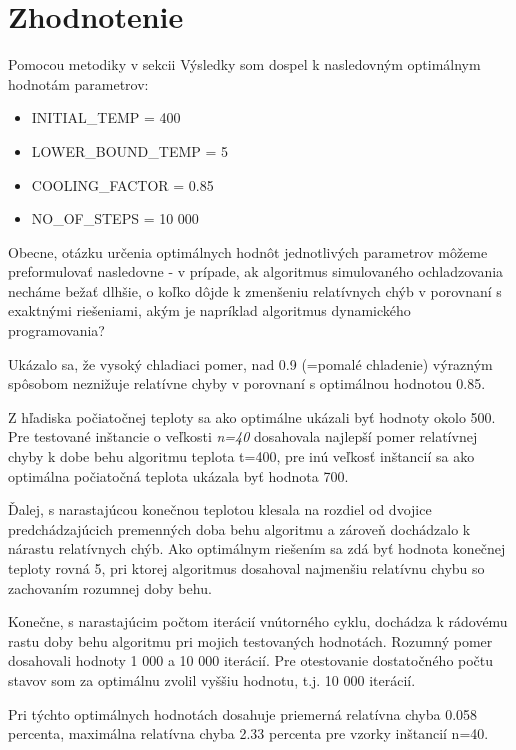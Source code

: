 \documentclass[slovak]{article}
\begin{document}
\section{Zhodnotenie}

Pomocou metodiky v sekcii Výsledky som dospel k nasledovným optimálnym hodnotám parametrov:
\begin{itemize}
  \item INITIAL\_TEMP = 400
  \item LOWER\_BOUND\_TEMP = 5
  \item COOLING\_FACTOR = 0.85
  \item NO\_OF\_STEPS = 10 000
\end{itemize}

Obecne, otázku určenia optimálnych hodnôt jednotlivých parametrov môžeme preformulovať nasledovne - v prípade, ak algoritmus simulovaného ochladzovania necháme bežať dlhšie, o koľko dôjde k zmenšeniu relatívnych chýb v porovnaní s exaktnými riešeniami, akým je napríklad algoritmus dynamického programovania? 

Ukázalo sa, že vysoký chladiaci pomer, nad 0.9 (=pomalé chladenie) výrazným spôsobom neznižuje relatívne chyby v porovnaní s optimálnou hodnotou 0.85.

Z hľadiska počiatočnej teploty sa ako optimálne ukázali byť hodnoty okolo 500. Pre testované inštancie o veľkosti \emph{n=40} dosahovala najlepší pomer relatívnej chyby k dobe behu algoritmu teplota t=400, pre inú veľkosť inštancií sa ako optimálna počiatočná teplota ukázala byť hodnota 700.

Ďalej, s narastajúcou konečnou teplotou klesala na rozdiel od dvojice predchádzajúcich premenných doba behu algoritmu a zároveň dochádzalo k nárastu relatívnych chýb.  Ako optimálnym riešením sa zdá byť hodnota konečnej teploty rovná 5, pri ktorej algoritmus dosahoval najmenšiu relatívnu chybu so zachovaním rozumnej doby behu.

Konečne, s narastajúcim počtom iterácií vnútorného cyklu, dochádza k rádovému rastu doby behu algoritmu pri mojich testovaných hodnotách. Rozumný pomer dosahovali hodnoty 1 000 a 10 000 iterácií. Pre otestovanie dostatočného počtu stavov som za optimálnu zvolil vyššiu hodnotu, t.j. 10 000 iterácií.  

Pri týchto optimálnych hodnotách dosahuje priemerná relatívna chyba 0.058 percenta, maximálna relatívna chyba 2.33 percenta pre vzorky inštancií n=40.
\end{document}
